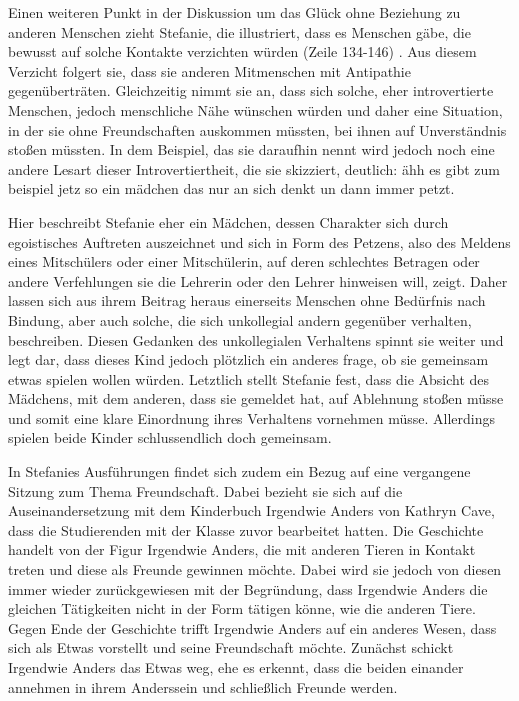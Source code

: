 Einen weiteren Punkt in der Diskussion um das Glück ohne Beziehung zu anderen Menschen zieht Stefanie, die illustriert, dass es Menschen gäbe, die bewusst auf solche Kontakte verzichten würden (Zeile 134-146) . 
Aus diesem Verzicht folgert sie, dass sie anderen Mitmenschen mit Antipathie gegenüberträten. 
Gleichzeitig nimmt sie an, dass sich solche, eher introvertierte Menschen, jedoch menschliche Nähe wünschen würden und daher eine  Situation, in der sie ohne Freundschaften auskommen müssten, bei ihnen auf Unverständnis stoßen müssten.
In dem Beispiel, das sie daraufhin nennt wird jedoch noch eine andere Lesart dieser Introvertiertheit, die sie skizziert, deutlich: \glqq ähh es gibt zum beispiel jetz so ein mädchen das nur an sich denkt un dann immer petzt.\grqq{}

Hier beschreibt Stefanie eher ein Mädchen, dessen Charakter sich durch egoistisches Auftreten auszeichnet und sich in Form des \glqq Petzens\grqq{}, also des Meldens eines Mitschülers oder einer Mitschülerin, auf deren schlechtes Betragen oder andere Verfehlungen sie die Lehrerin oder den Lehrer hinweisen will, zeigt. 
Daher lassen sich aus ihrem Beitrag heraus einerseits Menschen ohne Bedürfnis nach Bindung, aber auch solche, die sich unkollegial andern gegenüber verhalten, beschreiben. 
Diesen Gedanken des unkollegialen Verhaltens spinnt sie weiter und legt dar, dass dieses Kind jedoch plötzlich ein anderes frage, ob sie gemeinsam etwas spielen wollen würden. 
Letztlich stellt Stefanie fest, dass die Absicht des Mädchens, mit dem anderen, dass sie gemeldet hat, auf Ablehnung stoßen müsse und somit eine klare Einordnung ihres Verhaltens vornehmen müsse. 
Allerdings spielen beide Kinder schlussendlich doch gemeinsam. 

In Stefanies Ausführungen findet sich zudem ein Bezug auf eine vergangene Sitzung zum Thema \glqq Freundschaft\grqq{}. 
Dabei bezieht sie sich auf die Auseinandersetzung mit dem Kinderbuch \glqq Irgendwie Anders\grqq{} von Kathryn Cave, dass die Studierenden mit der Klasse zuvor bearbeitet hatten. 
Die Geschichte handelt von der Figur \glqq Irgendwie Anders\grqq{}, die mit anderen Tieren in Kontakt treten und diese als Freunde gewinnen möchte. 
Dabei wird sie jedoch von diesen immer wieder zurückgewiesen mit der Begründung, dass Irgendwie Anders die gleichen Tätigkeiten nicht in der Form tätigen könne, wie die anderen Tiere. 
Gegen Ende der Geschichte trifft Irgendwie Anders auf ein anderes Wesen, dass sich als \glqq Etwas\grqq{} vorstellt und seine Freundschaft möchte. 
Zunächst schickt Irgendwie Anders das Etwas weg, ehe es erkennt, dass die beiden einander annehmen in ihrem Anderssein und schließlich Freunde werden.


